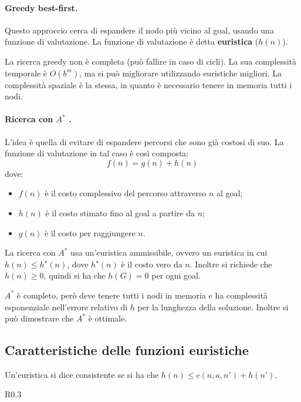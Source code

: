 \documentclass[a4paper, 11pt]{article}
\newcommand{\astar}{$A^\ast$ }
\begin{document}
\paragraph{Greedy best-first.} Questo approccio cerca di espandere il nodo più vicino al goal, usando una funzione di valutazione. La funzione di valutazione è detta \textbf{euristica} ($h(n)$).

La ricerca greedy non è completa (può fallire in caso di cicli). La sua complessità temporale è $O(b^m)$, ma si può migliorare utilizzando euristiche migliori. La complessità spaziale è la stessa, in quanto è necessario tenere in memoria tutti i nodi.

\paragraph{Ricerca con \astar.} L'idea è quella di evitare di espandere percorsi che sono già costosi di suo. La funzione di valutazione in tal caso è così composta: \[ f(n) = g(n) + h(n) \] dove: \begin{itemize}
	\item $f(n)$ è il costo complessivo del percorso attraverso $n$ al goal;
	\item $h(n)$ è il costo stimato fino al goal a partire da $n$;
	\item $g(n)$ è il costo per raggiungere $n$.
\end{itemize}

La ricerca con \astar usa un'euristica ammissibile, ovvero un euristica in cui $h(n) \leq h^\star(n)$, dove $h^\star(n)$ è il costo vero da $n$. Inoltre si richiede che $h(n) \geq 0$, quindi si ha che $h(G) = 0$ per ogni goal.

\astar è completo, però deve tenere tutti i nodi in memoria e ha complessità esponenziale nell'errore relativo di $h$ per la lunghezza della soluzione. Inoltre si può dimostrare che \astar è ottimale.

\subsection{Caratteristiche delle funzioni euristiche}
Un'euristica si dice consistente se si ha che $h(n) \leq c(n,a,n') + h(n')$.
\begin{wrapfigure}{R}{0.3\textwidth}
\end{wrapfigure}
\end{document}
